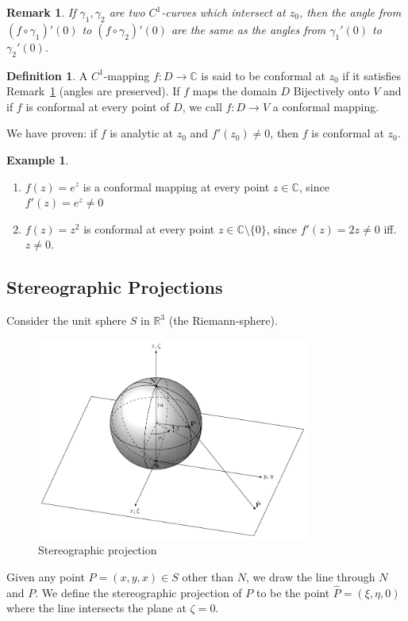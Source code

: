 \documentclass[12pt, a4paper]{article}
\theoremstyle{plain}
\newtheorem{rem}{Remark}
\theoremstyle{definition}
\newtheorem{definition}{Definition} %
\newtheorem{example}{Example} %
\begin{document}
			\begin{rem}
			\label{rem:conformality}
				If $\gamma_1,\gamma_2$ are two $C^1$-curves which intersect at $z_0$, then the angle from $(f\circ \gamma_1)'(0)$ to $(f\circ \gamma_2)'(0)$ are the same as the angles from $\gamma_1'(0)$ to $\gamma_2'(0)$.\\
			\end{rem}

			\begin{definition}
				A $C^1$-mapping $f:D\to \mathbb{C}$ is said to be conformal at $z_0$ if it satisfies Remark~\ref{rem:conformality} (angles are preserved). If $f$ maps the domain $D$ Bijectively onto $V$ and if $f$ is conformal at every point of $D$, we call $f:D\to V$ a conformal mapping.\\
			\end{definition}

			We have proven: if $f$ is analytic at $z_0$ and $f'(z_0)\not = 0$, then $f$ is conformal at $z_0$.

			\begin{example}
				\begin{enumerate}
					\item $f(z)=e^z$ is a conformal mapping at every point $z\in \mathbb{C}$, since $f'(z) = e^z \not = 0$
					\item $f(z) = z^2$ is conformal at every point $z\in \mathbb{C}\setminus\{0\}$, since $f'(z) = 2z\not=0$ iff. $z\not=0$.
				\end{enumerate}
			\end{example}
		\subsection{Stereographic Projections} %
		\label{sub:stereographic_projections}
			Consider the unit sphere $S$ in $\mathbb{R}^3$ (the Riemann-sphere). 
			\begin{figure}[H]
			\centering
				\includegraphics[width=0.8\textwidth]{stereographic_projection.png}
				\caption{\label{fig:stereographic_projection}Stereographic projection}
			\end{figure}
			Given any point $P=(x,y,x)\in S$ other than $N$, we draw the line through $N$ and $P$. We define the stereographic projection of $P$ to be the point $\hat{P} = (\xi,\eta,0)$ where the line intersects the plane at $\zeta = 0$.
\end{document}
